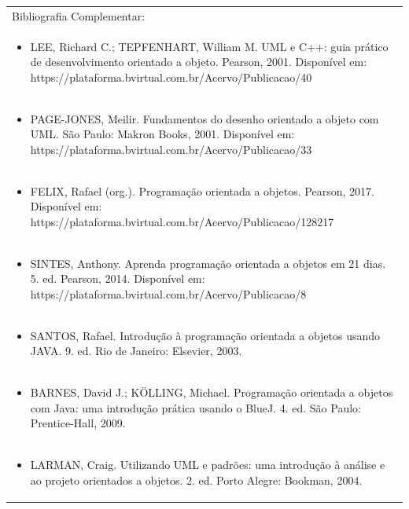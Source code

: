 \documentclass[11pt]{article}
\begin{document}
\begin{center}
\begin{longtable}{|p{4cm}|p{4cm}|p{4cm}|p{4cm}|}
\multicolumn{4}{|p{16cm}|}{Bibliografia Complementar:}\\*
\multicolumn{4}{|p{\dimexpr 16cm + 6\tabcolsep\relax}|}{\begin{itemize}\item LEE, Richard C.; TEPFENHART, William M. UML e C++: guia prático de desenvolvimento orientado a objeto. Pearson, 2001. Disponível em: https://plataforma.bvirtual.com.br/Acervo/Publicacao/40\end{itemize}}\\
\multicolumn{4}{|p{\dimexpr 16cm + 6\tabcolsep\relax}|}{\begin{itemize}\item PAGE-JONES, Meilir. Fundamentos do desenho orientado a objeto com UML. São Paulo: Makron Books, 2001. Disponível em: https://plataforma.bvirtual.com.br/Acervo/Publicacao/33\end{itemize}}\\
\multicolumn{4}{|p{\dimexpr 16cm + 6\tabcolsep\relax}|}{\begin{itemize}\item FELIX, Rafael (org.). Programação orientada a objetos. Pearson, 2017. Disponível em: https://plataforma.bvirtual.com.br/Acervo/Publicacao/128217\end{itemize}}\\
\multicolumn{4}{|p{\dimexpr 16cm + 6\tabcolsep\relax}|}{\begin{itemize}\item SINTES, Anthony. Aprenda programação orientada a objetos em 21 dias. 5. ed. Pearson, 2014. Disponível em: https://plataforma.bvirtual.com.br/Acervo/Publicacao/8\end{itemize}}\\
\multicolumn{4}{|p{\dimexpr 16cm + 6\tabcolsep\relax}|}{\begin{itemize}\item SANTOS, Rafael. Introdução à programação orientada a objetos usando JAVA. 9. ed. Rio de Janeiro: Elsevier, 2003.\end{itemize}}\\
\multicolumn{4}{|p{\dimexpr 16cm + 6\tabcolsep\relax}|}{\begin{itemize}\item BARNES, David J.; KÖLLING, Michael. Programação orientada a objetos com Java: uma introdução prática usando o BlueJ. 4. ed. São Paulo: Prentice-Hall, 2009.\end{itemize}}\\
\multicolumn{4}{|p{\dimexpr 16cm + 6\tabcolsep\relax}|}{\begin{itemize}\item LARMAN, Craig. Utilizando UML e padrões: uma introdução à análise e ao projeto orientados a objetos. 2. ed. Porto Alegre: Bookman, 2004.\end{itemize}}\\
\hline
\end{longtable}
\end{center}
\end{document}
